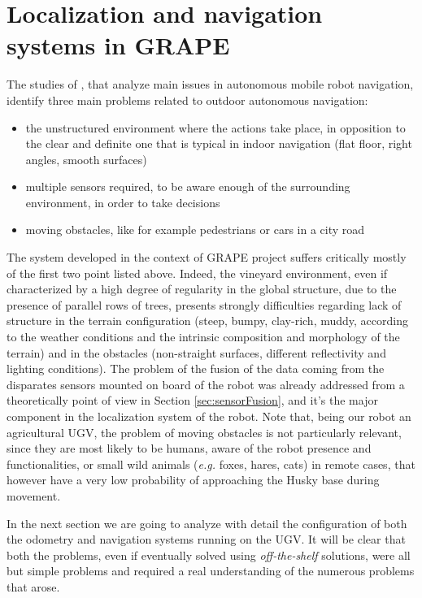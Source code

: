 
\chapter{Localization and navigation systems in GRAPE} \label{chap:localization}

The studies of \cite{outdoorNavigation}, that analyze main issues in autonomous mobile robot navigation, identify three main problems related to outdoor autonomous navigation:
\begin{itemize}
	\item the unstructured environment where the actions take place, in opposition to the clear and definite one that is typical in indoor navigation (flat floor, right angles, smooth surfaces)
	\item multiple sensors required, to be aware enough of the surrounding environment, in order to take decisions
	\item moving obstacles, like for example pedestrians or cars in a city road
\end{itemize}
The system developed in the context of \ac{GRAPE} project suffers critically mostly of the first two point listed above. Indeed, the vineyard environment, even if characterized by a high degree of regularity in the global structure, due to the presence of parallel rows of trees, presents strongly difficulties regarding lack of structure in the terrain configuration (steep, bumpy, clay-rich, muddy, according to the weather conditions and the intrinsic composition and morphology of the terrain) and in the obstacles (non-straight surfaces, different reflectivity and lighting conditions). The problem of the fusion of the data coming from the disparates sensors mounted on board of the robot was already addressed from a theoretically point of view in Section \ref{sec:sensorFusion}, and it's the major component in the localization system of the robot. Note that, being our robot an agricultural \ac{UGV}, the problem of moving obstacles is not particularly relevant, since they are most likely to be humans, aware of the robot presence and functionalities, or small wild animals (\textit{e.g.} foxes, hares, cats) in remote cases, that however have a very low probability of approaching the Husky base during movement.

\par In the next section we are going to analyze with detail the configuration of both the odometry and navigation systems running on the \ac{UGV}. It will be clear that both the problems, even if eventually solved using \textit{off-the-shelf} solutions, were all but simple problems and required a real understanding of the numerous problems that arose.

